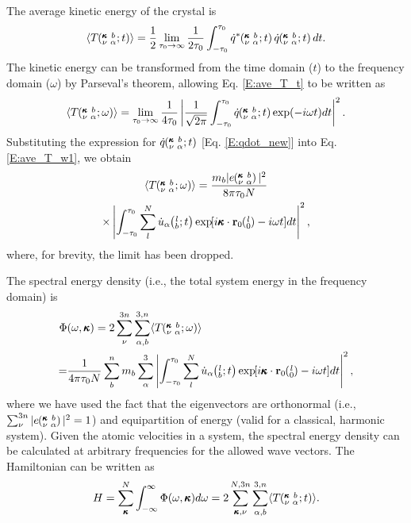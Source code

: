\documentclass[twocolumn,10pt]{asme2e}
\newcommand{\EXP}[1]{\exp\mspace{-5.0mu}\left[#1\right]\mspace{-3.0mu}}
\newcommand{\ab}[2]{\mspace{-4.0mu}\left(\mspace{-8.0mu}\begin{smallmatrix}&\ifthenelse{\equal{#1}{}}{a}{#1} \\&\ifthenelse{\equal{#2}{}}{b}{#2}\end{smallmatrix}\mspace{-3.0mu}\right)}
\newcommand{\kvbat}{\mspace{-4.0mu}\left(\mspace{-8.0mu}\begin{smallmatrix} &\pmb{\kappa} &b \\ &\nu &\alpha\end{smallmatrix}\mspace{-2.0mu};t\right)}
\newcommand{\kvbaw}{\mspace{-4.0mu}\left(\mspace{-8.0mu}\begin{smallmatrix} &\pmb{\kappa} &b \\ &\nu &\alpha\end{smallmatrix}\mspace{-2.0mu};\omega\right)}
\newcommand{\kvba}{\mspace{-4.0mu}\left(\mspace{-8.0mu}\begin{smallmatrix} &\pmb{\kappa} &b \\ &\nu &\alpha\end{smallmatrix}\mspace{-3.0mu}\right)}
\newcommand{\lbt}{\mspace{-4.0mu}\left(\mspace{-8.0mu}\begin{smallmatrix}&l \\&b\end{smallmatrix}\mspace{-2.0mu};t\right)}
\begin{document}
The average kinetic energy of the crystal is
\begin{equation}\label{E:ave_T_t}
\langle T\kvbat\rangle=\frac{1}{2}\lim_{\tau_0\rightarrow\infty}\frac{1}{2\tau_0}\int_{-\tau_0}^{\tau_0}\dot{q}^*\kvbat\dot{q}\kvbat dt.
\end{equation}
The kinetic energy can be transformed from the time domain ($t$) to the
frequency domain ($\omega$) by Parseval's theorem\cite{rudin1987},  allowing
Eq$.$ \eqref{E:ave_T_t} to be written as
\begin{equation}\label{E:ave_T_w1}
\langle T\kvbaw\rangle=\lim_{\tau_0\rightarrow\infty}\frac{1}{4\tau_0}\left|\frac{1}{\sqrt{2\pi}}\int_{-\tau_0}^{\tau_0}\dot{q}\kvbat\exp(-i\omega t)dt\right|^2.
\end{equation}
Substituting the expression for $\dot{q}\kvbat$ [Eq$.$ \eqref{E:qdot_new}] into Eq$.$ \eqref{E:ave_T_w1}, we obtain
\begin{multline}\label{E:ave_T_w}
\langle T\kvbaw\rangle=\frac{m_b|e\kvba|^2}{8\pi\tau_0N}\\
\times\left|\int_{-\tau_0}^{\tau_0}\sum_l^N\dot{u}_{\alpha}\lbt\EXP{i\pmb{\kappa}\cdot\mathbf{r}_0\ab{l}{0}-i\omega t}dt\right|^2,
\end{multline}
where, for brevity, the limit has been dropped.

The spectral energy density (i$.$e$.$, the total system energy in the frequency domain) is
\begin{equation}\label{E:SED}
\begin{split}
\Phi&(\omega,\pmb{\kappa})=2\sum_{\nu}^{3n}\sum_{\alpha,b}^{3,n}\langle T\kvbaw\rangle\\
                         =&\frac{1}{4\pi\tau_0N}\sum_b^nm_b\sum_{\alpha}^3\left|\int_{-\tau_0}^{\tau_0}\sum_l^N\dot{u}_{\alpha}\lbt\EXP{i\pmb{\kappa}\cdot\mathbf{r}_0\ab{l}{0}-i\omega t}dt\right|^2,
\end{split}
\end{equation}
where we have used the fact that the eigenvectors are orthonormal (i$.$e$.$,
$\sum_{\nu}^{3n}|e\kvba|^2=1$)\cite{dove1993} and equipartition of energy
(valid for a classical, harmonic system). Given the atomic velocities in a
system, the spectral energy density can be calculated at arbitrary
frequencies for the allowed wave vectors. The Hamiltonian can be written as
\begin{equation}\label{E:equipartition}
H=\sum_{\pmb{\kappa}}^{N}\int_{-\infty}^{\infty}\Phi(\omega,\pmb{\kappa})d\omega=2\sum_{\pmb{\kappa},\nu}^{N,3n}\sum_{\alpha,b}^{3,n}\langle T\kvbat\rangle.
\end{equation}
\end{document}
